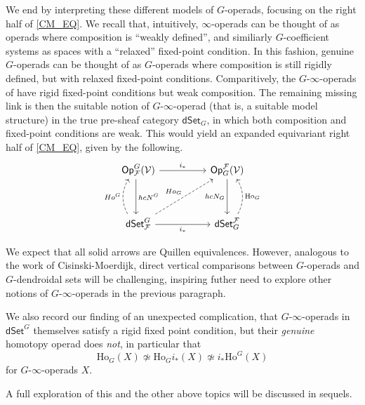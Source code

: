 \documentclass[a4paper,10pt]{article}%
\begin{document}
We end by interpreting these different models of $G$-operads, focusing on the right half of \ref{CM_EQ}. 
We recall that, intuitively, $\infty$-operads can be thought of as operads where composition is ``weakly defined'', 
and similiarly $G$-coefficient systems as spaces with a ``relaxed'' fixed-point condition. 
In this fashion, genuine $G$-operads can be thought of as $G$-operads where composition is still rigidly defined, but with relaxed fixed-point conditions. 
Comparitively, the $G$-$\infty$-operads of \cite{Pe17} have rigid fixed-point conditions but weak composition. 
The remaining missing link is then the suitable notion of $G$-$\infty$-operad (that is, a suitable model structure) in the true pre-sheaf category $\mathsf{dSet}_G$, in which both composition and fixed-point conditions are weak. 
This would yield an expanded equivariant right half of \ref{CM_EQ}, given by the following.
\[
\begin{tikzcd}
        \Op^G_{\mathcal F}(\V) \arrow[rr, "i_*"] \arrow[dd, shift right, "hcN^G"]& & \Op_G^{\mathcal F}(\V) \arrow[dd, "hcN_G"']\\ \\
        \mathsf{dSet}^G_{\mathcal F} \arrow[rr, "i_*"'] \arrow[uu, shift left, shift left, dashed, bend left, "Ho^G"] \arrow[uurr, "Ho_G", dashed] && \mathsf{dSet}_G^{\mathcal F} \arrow[uu, shift right, shift right, bend right, dashed, "\mathrm{Ho}_G"']
\end{tikzcd}
\]

We expect that all solid arrows are Quillen equivalences. However, analogous to the work of Cisinski-Moerdijk, direct vertical comparisons between $G$-operads and $G$-dendroidal sets will be challenging, inspiring futher need to explore other notions of $G$-$\infty$-operads in the previous paragraph. 

We also record our finding of an unexpected complication, that $G$-$\infty$-operads in $\mathsf{dSet}^G$ themselves satisfy a rigid fixed point condition, but their \textit{genuine} homotopy operad does \textit{not}, in particular that 
\[
\mathrm{Ho}_G(X) \not\simeq \mathrm{Ho}_G i_*(X) \not\simeq i_* \mathrm{Ho}^G(X)
\]
for $G$-$\infty$-operads $X$. 

A full exploration of this and the other above topics will be discussed in sequels.

\end{document}
